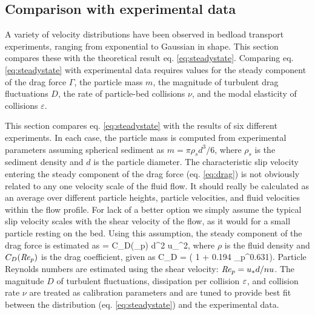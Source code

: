\subsection{Comparison with experimental data}
\label{sec:langexperimentcomparison}

A variety of velocity distributions have been observed in bedload transport experiments, ranging from exponential to Gaussian in shape. 
This section compares these with the theoretical result eq. \ref{eq:steadystate}.
Comparing eq. \ref{eq:steadystate} with experimental data requires values for the steady component of the drag force $\Gamma$, the particle mass $m$, the magnitude of turbulent drag fluctuations $D$, the rate of particle-bed collisions $\nu$, and the modal elasticity of collisions $\varepsilon$.

This section compares eq. \ref{eq:steadystate} with the results of six different experiments.
In each case, the particle mass is computed from experimental parameters assuming spherical sediment as $m = \pi \rho_s d^3/6$, where $\rho_s$ is the sediment density and $d$ is the particle diameter.
The characteristic slip velocity entering the steady component of the drag force (eq. \ref{eq:drag}) is not obviously related to any one velocity scale of the fluid flow. It should really be calculated as an average over different particle heights, particle velocities, and fluid velocities within the flow profile. For lack of a better option we simply assume the typical slip velocity scales with the shear velocity of the flow, as it would for a small particle resting on the bed. Using this assumption, the steady component of the drag force is estimated as
\be \Gamma =  \rho C_D(\Rey_p) d^2 u_\ast^2,\ee
where $\rho$ is the fluid density and $C_D(\mbox{\textit{Re}}_p)$ is the drag coefficient, given as \citep{Clift1978,Gonzalez2017}
\be C_D = ( 1 + 0.194 \Rey_p^{0.631}). \ee
Particle Reynolds numbers are estimated using the shear velocity: $\mbox{\textit{Re}}_p= u_\ast d/nu$. 
The magnitude $D$ of turbulent fluctuations, dissipation per collision $\varepsilon$, and collision rate $\nu$ are treated as calibration parameters and are tuned to provide best fit between the distribution (eq. \ref{eq:steadystate}) and the experimental data.

